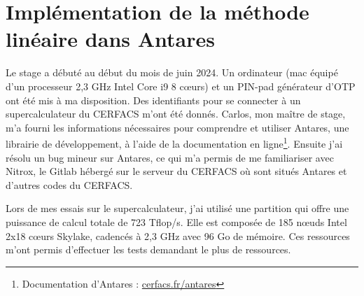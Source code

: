 \chapter{Implémentation de la méthode linéaire dans Antares}




Le stage a débuté au début du mois de juin 2024. Un ordinateur (mac équipé d'un processeur 2,3 GHz Intel Core i9 8 cœurs) et un PIN-pad générateur d'\ac{OTP} ont été mis à ma disposition. Des identifiants pour se connecter à un supercalculateur du CERFACS m'ont été donnés. Carlos, mon maître de stage, m'a fourni les informations nécessaires pour comprendre et utiliser Antares, une librairie de développement, à l'aide de la documentation en ligne\footnote{Documentation d'Antares : \href{https://cerfacs.fr/antares/}{cerfacs.fr/antares}}. Ensuite j'ai résolu un bug mineur sur Antares, ce qui m'a permis de me familiariser avec Nitrox, le Gitlab hébergé sur le serveur du CERFACS où sont situés Antares et d'autres codes du CERFACS.

Lors de mes essais sur le supercalculateur, j'ai utilisé une partition qui offre une puissance de calcul totale de 723 Tflop/s. Elle est composée de 185 nœuds Intel 2x18 cœurs Skylake, cadencés à 2,3 GHz avec 96 Go de mémoire. Ces ressources m'ont permis d'effectuer les tests demandant le plus de ressources.

